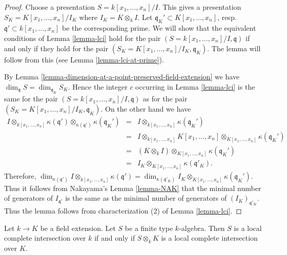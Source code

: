 \begin{proof}
Choose a presentation $S = k[x_1, \ldots, x_n]/I$.
This gives a presentation
$S_K = K[x_1, \ldots, x_n]/I_K$ where $I_K = K \otimes_k I$.
Let $\mathfrak q_K' \subset K[x_1, \ldots, x_n]$,
resp.\ $\mathfrak q' \subset k[x_1, \ldots, x_n]$ be
the corresponding prime. We will show that the equivalent conditions
of Lemma \ref{lemma-lci}
hold for the pair $(S = k[x_1, \ldots, x_n]/I, \mathfrak q)$
if and only if they hold for the pair
$(S_K = K[x_1, \ldots, x_n]/I_K, \mathfrak q_K)$.
The lemma will follow from this (see Lemma \ref{lemma-lci-at-prime}).

\medskip\noindent
By Lemma \ref{lemma-dimension-at-a-point-preserved-field-extension} we have
$\dim_{\mathfrak q} S = \dim_{\mathfrak q_K} S_K$.
Hence the integer $c$ occurring in Lemma \ref{lemma-lci}
is the same for the pair $(S = k[x_1, \ldots, x_n]/I, \mathfrak q)$
as for the pair $(S_K = K[x_1, \ldots, x_n]/I_K, \mathfrak q_K)$.
On the other hand we have
\begin{eqnarray*}
I \otimes_{k[x_1, \ldots, x_n]} \kappa(\mathfrak q')
\otimes_{\kappa(\mathfrak q')} \kappa(\mathfrak q_K')
& = &
I \otimes_{k[x_1, \ldots, x_n]} \kappa(\mathfrak q_K') \\
& = &
I \otimes_{k[x_1, \ldots, x_n]} K[x_1, \ldots, x_n]
\otimes_{K[x_1, \ldots, x_n]} \kappa(\mathfrak q_K') \\
& = &
(K \otimes_k I) \otimes_{K[x_1, \ldots, x_n]} \kappa(\mathfrak q_K') \\
& = &
I_K \otimes_{K[x_1, \ldots, x_n]} \kappa(\mathfrak q'_K).
\end{eqnarray*}
Therefore,
$\dim_{\kappa(\mathfrak q')}
I \otimes_{k[x_1, \ldots, x_n]} \kappa(\mathfrak q')
=
\dim_{\kappa(\mathfrak q'_K)}
I_K \otimes_{K[x_1, \ldots, x_n]} \kappa(\mathfrak q_K')$.
Thus it follows from
Nakayama's Lemma \ref{lemma-NAK} that the minimal number
of generators of $I_{\mathfrak q'}$ is the same as the minimal
number of generators of $(I_K)_{\mathfrak q'_K}$.
Thus the lemma follows from characterization (2) of Lemma \ref{lemma-lci}.
\end{proof}

\begin{lemma}
\label{lemma-lci-field-change}
Let $k \to K$ be a field extension.
Let $S$ be a finite type $k$-algebra.
Then $S$ is a local complete intersection over $k$ if and
only if $S \otimes_k K$ is a local complete intersection over $K$.
\end{lemma}

